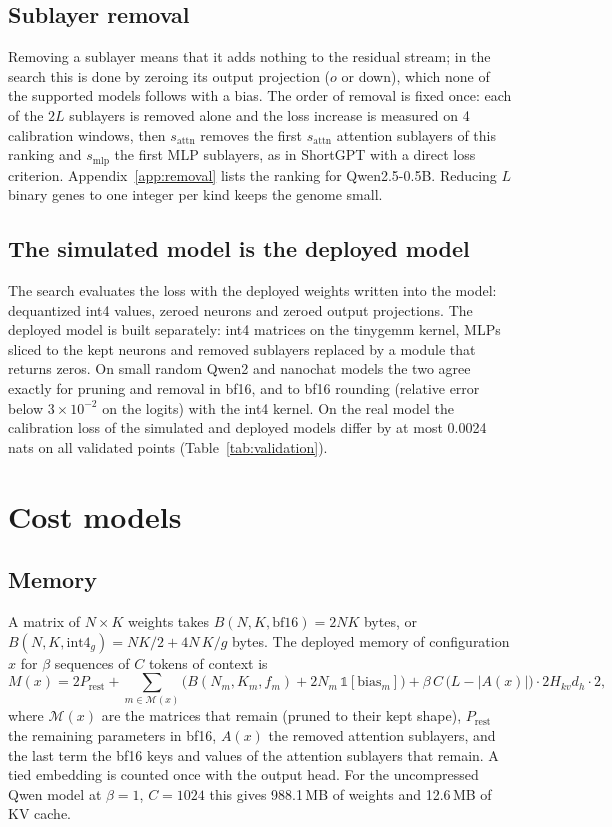 \documentclass[11pt]{article}
\begin{document}
\subsection{Sublayer removal}
Removing a sublayer means that it adds nothing to the residual stream; in the search this is done by
zeroing its output projection ($o$ or down), which none of the supported models follows with a bias. The
order of removal is fixed once: each of the $2L$ sublayers is removed alone and the loss increase is
measured on 4 calibration windows, then $s_{\text{attn}}$ removes the first $s_{\text{attn}}$ attention
sublayers of this ranking and $s_{\text{mlp}}$ the first MLP sublayers, as in ShortGPT
\cite{men2024shortgpt} with a direct loss criterion. Appendix~\ref{app:removal} lists the ranking for
Qwen2.5-0.5B. Reducing $L$ binary genes to one integer per kind keeps the genome small.

\subsection{The simulated model is the deployed model}
The search evaluates the loss with the deployed weights written into the model: dequantized int4 values,
zeroed neurons and zeroed output projections. The deployed model is built separately: int4 matrices on
the tinygemm kernel, MLPs sliced to the kept neurons and removed sublayers replaced by a module that
returns zeros. On small random Qwen2 and nanochat models the two agree exactly for pruning and removal
in bf16, and to bf16 rounding (relative error below $3\times10^{-2}$ on the logits) with the int4 kernel. On the real model the calibration loss of the
simulated and deployed models differ by at most 0.0024 nats on all validated points
(Table~\ref{tab:validation}).

\section{Cost models}
\label{sec:cost}

\subsection{Memory}
A matrix of $N\times K$ weights takes $B(N,K,\text{bf16})=2NK$ bytes, or
$B(N,K,\text{int4}_g)=NK/2+4N\,K/g$ bytes. The deployed memory of configuration $x$ for $\beta$ sequences
of $C$ tokens of context is
\begin{equation}
  M(x) = 2P_{\text{rest}} + \sum_{m\in\mathcal{M}(x)}\Big(B(N_m,K_m,f_m)+2N_m\,\mathbb{1}[\text{bias}_m]\Big)
       + \beta\, C\,\big(L-|A(x)|\big)\cdot 2H_{kv}d_h\cdot 2 ,
\end{equation}
where $\mathcal{M}(x)$ are the matrices that remain (pruned to their kept shape), $P_{\text{rest}}$ the
remaining parameters in bf16, $A(x)$ the removed attention sublayers, and the last term the bf16 keys and
values of the attention sublayers that remain. A tied embedding is counted once with the output head.
For the uncompressed Qwen model at $\beta=1$, $C=1024$ this gives 988.1\,MB of weights and 12.6\,MB of
KV cache.
\end{document}
